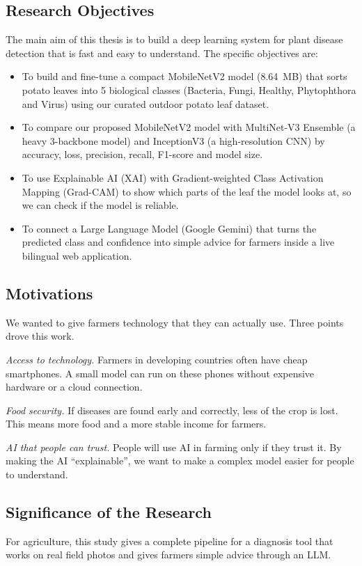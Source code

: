 \subsection{Research Objectives}
The main aim of this thesis is to build a deep learning system for plant disease detection that is fast and easy to understand. The specific objectives are:
\begin{itemize}
    \item To build and fine-tune a compact MobileNetV2 model (8.64~MB) that sorts potato leaves into 5 biological classes (Bacteria, Fungi, Healthy, Phytophthora and Virus) using our curated outdoor potato leaf dataset. %
    \item To compare our proposed MobileNetV2 model with MultiNet-V3 Ensemble (a heavy 3-backbone model) and InceptionV3 (a high-resolution CNN) by accuracy, loss, precision, recall, F1-score and model size.
    \item To use Explainable AI (XAI) with Gradient-weighted Class Activation Mapping (Grad-CAM) to show which parts of the leaf the model looks at, so we can check if the model is reliable. %
    \item To connect a Large Language Model (Google Gemini) that turns the predicted class and confidence into simple advice for farmers inside a live bilingual web application.
\end{itemize}

\subsection{Motivations}
We wanted to give farmers technology that they can actually use. Three points drove this work.

\textit{Access to technology.} Farmers in developing countries often have cheap smartphones. A small model can run on these phones without expensive hardware or a cloud connection. %

\textit{Food security.} If diseases are found early and correctly, less of the crop is lost. This means more food and a more stable income for farmers. %

\textit{AI that people can trust.} People will use AI in farming only if they trust it. By making the AI ``explainable'', we want to make a complex model easier for people to understand. %

\subsection{Significance of the Research}
For agriculture, this study gives a complete pipeline for a diagnosis tool that works on real field photos and gives farmers simple advice through an LLM.

